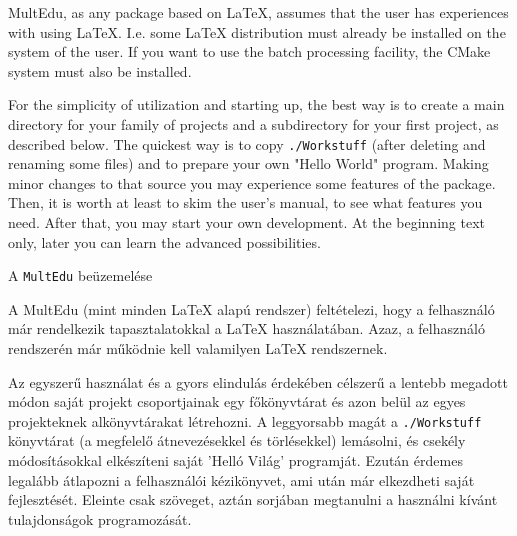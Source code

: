 {
\gls{MultEdu}, as any package based on \LaTeX, assumes that the user has
experiences with using \LaTeX. I.e. some \LaTeX{} distribution must already be installed on the system of the user. If you want to use the
batch processing facility, the CMake system must also be installed.

For the simplicity of utilization and starting up, 
the best way is to create a main directory for your family of projects and a subdirectory for your first project, 
as described below. The quickest way is to copy \lstinline|./Workstuff| (after deleting and renaming some files)
and to prepare your own "Hello World" program.
Making minor changes to that source you may experience
some features of the package. Then, it is worth at least to skim the user's manual, to see what features you need. After that, you may start your own development.
At the beginning text only, later you can learn the advanced
possibilities.
}
{A \lstinline|MultEdu| beüzemelése}
{
A \gls{MultEdu} (mint minden \LaTeX{} alapú rendszer) feltételezi, hogy 
a felhasználó már rendelkezik tapasztalatokkal a \LaTeX{}  használatában.
Azaz, a felhasználó rendszerén már működnie kell valamilyen \LaTeX{}
rendszernek.

Az egyszerű használat és a gyors elindulás érdekében célszerű a 
lentebb megadott módon saját projekt csoportjainak egy főkönyvtárat és
azon belül az egyes projekteknek alkönyvtárakat létrehozni.
A leggyorsabb magát a \lstinline|./Workstuff| könyvtárat (a megfelelő átnevezésekkel és törlésekkel) lemásolni, és csekély 
módosításokkal elkészíteni saját 'Helló Világ' programját.
Ezután érdemes legalább átlapozni a
felhasználói kézikönyvet, ami után már elkezdheti saját fejlesztését.
Eleinte csak szöveget, aztán sorjában megtanulni a használni kívánt tulajdonságok programozását.
}



